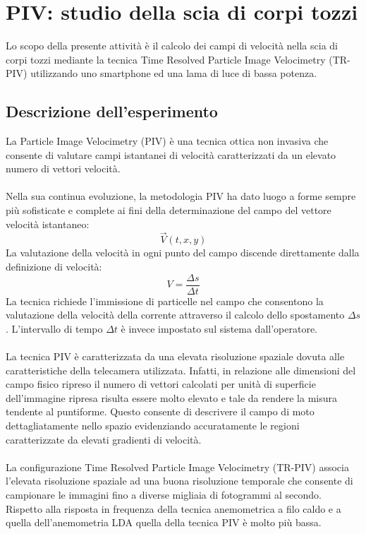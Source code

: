 \section{PIV: studio della scia di corpi tozzi}
Lo scopo della presente attività è il calcolo dei campi di velocità nella scia di corpi tozzi mediante la tecnica Time Resolved Particle Image Velocimetry (TR-PIV) utilizzando uno smartphone ed una lama di luce di bassa potenza.

\subsection{Descrizione dell'esperimento}
La Particle Image Velocimetry (PIV) è una tecnica ottica non invasiva che consente di valutare campi istantanei di velocità caratterizzati da un elevato numero di vettori velocità.\\\\
Nella sua continua evoluzione, la metodologia PIV ha dato luogo a forme sempre più sofisticate e complete ai fini della determinazione del campo del vettore velocità istantaneo:
\begin{equation*}
    \vec V (t, x, y)
\end{equation*}
La valutazione della velocità in ogni punto del campo discende direttamente dalla definizione di velocità:
\begin{equation*}
    V = \frac{\Delta s}{\Delta t}
\end{equation*}
La tecnica richiede l'immissione di particelle nel campo che consentono la valutazione della velocità della corrente attraverso il calcolo dello spostamento $\Delta s$. L'intervallo di tempo $\Delta t$ è invece impostato sul sistema dall'operatore.\\\\
La tecnica PIV è caratterizzata da una elevata risoluzione spaziale dovuta alle caratteristiche della telecamera utilizzata. Infatti, in relazione alle dimensioni del campo fisico ripreso il numero di vettori calcolati per unità di superficie dell'immagine ripresa risulta essere molto elevato e tale da rendere la misura tendente al puntiforme. Questo consente di descrivere il campo di moto dettagliatamente nello spazio evidenziando accuratamente le regioni caratterizzate da elevati gradienti di velocità.\\\\
La configurazione Time Resolved Particle Image Velocimetry (TR-PIV) associa l'elevata risoluzione spaziale ad una buona risoluzione temporale che consente di campionare le immagini fino a diverse migliaia di fotogrammi al secondo. Rispetto alla risposta in frequenza della tecnica anemometrica a filo caldo e a quella dell'anemometria LDA quella della tecnica PIV è molto più bassa.\\\\
